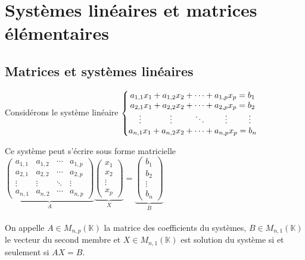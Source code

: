 \documentclass[a4paper,10pt]{book} %
\newcommand{\K}{\mathbb{K}}
\begin{document}
\section{Systèmes linéaires et matrices élémentaires}
\subsection{Matrices et systèmes linéaires}
Considérons le système linéaire $\left\{\begin{matrix}
a_{1,1}x_1 +a_{1,2}x_2+\cdots+a_{1,p}x_p=b_1 \\
a_{2,1}x_1 +a_{2,2}x_2+\cdots+a_{2,p}x_p=b_2 \\
\hspace*{0.2cm}\vdots \hspace*{1.2cm} \vdots \hspace*{0.9cm} \ddots \hspace*{0.8cm} \vdots \hspace*{0.9cm} \vdots \\
a_{n,1}x_1 +a_{n,2}x_2+\cdots+a_{n,p}x_p=b_n
\end{matrix}\right.$

\bigskip

Ce système peut s'écrire sous forme matricielle $\underbrace{\begin{pmatrix}
a_{1,1} & a_{1,2} & \cdots & a_{1,p}\\
a_{2,1} & a_{2,2} & \cdots & a_{2,p}\\
\vdots & \vdots & \ddots & \vdots \\
a_{n,1} & a_{n,2} & \cdots & a_{n,p}
\end{pmatrix}}_{A}
\underbrace{\begin{pmatrix}
x_1 \\ x_2 \\ \vdots \\ x_p
\end{pmatrix}}_{X}
= \underbrace{\begin{pmatrix}
b_1 \\ b_2 \\ \vdots \\ b_n
\end{pmatrix}}_{B}$ \\\\

On appelle $A\in M_{n,p}(\K)$ la matrice des coefficients du systèmes, $B\in M_{n,1}(\K)$ le vecteur du second membre et $X\in M_{n,1}(\K)$ est solution du système si et seulement si $AX=B$.
\end{document}
